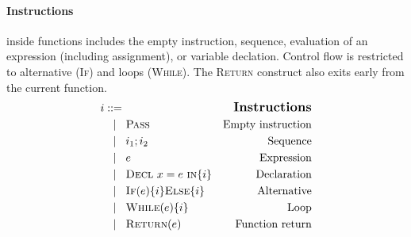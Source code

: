 \paragraph{Instructions} inside functions includes the empty instruction,
sequence, evaluation of an expression (including assignment), or variable
declation. Control flow is restricted to alternative (\textsc{If}) and loops
(\textsc{While}). The \textsc{Return} construct also exits early from the
current function.
{ \small \begin{align*}
  \gramdefshort{Instructions}{i}
                 { \iPass          }{Empty instruction}
                 { i_1;i_2         }{Sequence}
                 { e               }{Expression}
                 { \iDecl{x}{e}{i} }{Declaration}
                 { \iIf{e}{i}{i}   }{Alternative}
                 { \iWhile{e}{i}   }{Loop}
                 { \iReturn{e}     }{Function return}
                 {END}
\end{align*}}

